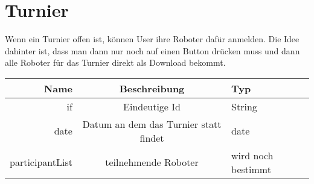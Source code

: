 \documentclass[Info_VK_Website_Dokumentation.tex]{subfiles}
\begin{document}
\section{Turnier} 

Wenn ein Turnier offen ist, können User ihre Roboter dafür anmelden. Die Idee dahinter ist, dass man dann nur noch auf einen Button drücken muss und dann alle Roboter für das Turnier direkt als Download bekommt.


\begin{table}[H]
\centering
\begin{tabular}{ r | c | l}
\textbf{Name} & \textbf{Beschreibung} & \textbf{Typ} \\
\hline
\hline
if       & Eindeutige Id & String \\
\hline
date  & Datum an dem das Turnier statt findet &  date \\
\hline
participantList & teilnehmende Roboter  & wird noch bestimmt \\ 
\end{tabular}
\end{table} 
\end{document}
